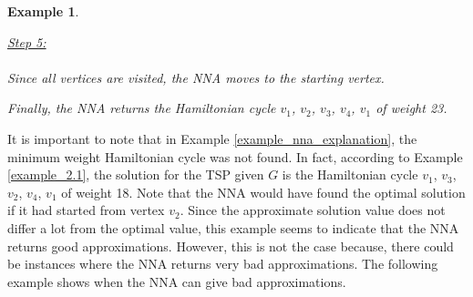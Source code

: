 \documentclass[12pt]{article}
\newtheorem{example}[definition]{Example}
\numberwithin{equation}{subsection}
\numberwithin{table}{subsection}
\numberwithin{algorithm}{subsection}
\numberwithin{figure}{subsection}
\begin{document}
\begin{example}
\begin{center}
\end{center}
\underline{Step 5:}\\\\
Since all vertices are visited, the NNA moves to the starting vertex.
\begin{center}
\end{center}
Finally, the NNA returns the Hamiltonian cycle $v_1$, $v_2$, $v_3$, $v_4$, $v_1$ of weight 23.
\end{example}
It is important to note that in Example \ref{example_nna_explanation}, the minimum weight Hamiltonian cycle was not found. In fact, according to Example \ref{example_2.1}, the solution for the TSP given $G$ is the Hamiltonian cycle $v_1$, $v_3$, $v_2$, $v_4$, $v_1$ of weight 18. Note that the NNA would have found the optimal solution if it had started from vertex $v_2$. Since the approximate solution value does not differ a lot from the optimal value, this example seems to indicate that the NNA returns good approximations. However, this is not the case because, there could be instances where the NNA returns very bad approximations. The following example shows when the NNA can give bad approximations.
\end{document}
